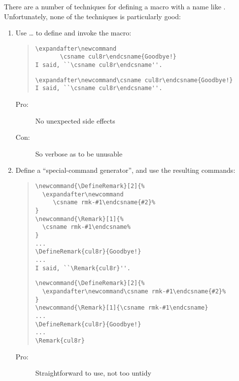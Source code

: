 There are a number of techniques for defining a macro with a name like
.  Unfortunately, none of the techniques is particularly
good:
\begin{enumerate}
\item Use \dots{} to define and invoke the
  macro:
\begin{quote}
\begin{narrowversion}
\begin{verbatim}
\expandafter\newcommand
       \csname cul8r\endcsname{Goodbye!}
I said, ``\csname cul8r\endcsname''.
\end{verbatim}
\end{narrowversion}
\begin{wideversion}
\begin{verbatim}
\expandafter\newcommand\csname cul8r\endcsname{Goodbye!}
I said, ``\csname cul8r\endcsname''.
\end{verbatim}
\end{wideversion}
\end{quote}
  \begin{description}
  \item[Pro:] No unexpected side effects
  \item[Con:] So verbose as to be unusable
  \end{description}
\item Define a ``special-command generator'', and  use the resulting
  commands:
\begin{quote}
\begin{narrowversion}
\begin{verbatim}
\newcommand{\DefineRemark}[2]{%
  \expandafter\newcommand
     \csname rmk-#1\endcsname{#2}%
}
\newcommand{\Remark}[1]{%
  \csname rmk-#1\endcsname%
}
...
\DefineRemark{cul8r}{Goodbye!}
...
I said, ``\Remark{cul8r}''.
\end{verbatim}
\end{narrowversion}
\begin{wideversion}
\begin{verbatim}
\newcommand{\DefineRemark}[2]{%
  \expandafter\newcommand\csname rmk-#1\endcsname{#2}%
}
\newcommand{\Remark}[1]{\csname rmk-#1\endcsname}
...
\DefineRemark{cul8r}{Goodbye!}
...
\Remark{cul8r}
\end{verbatim}
\end{wideversion}
\end{quote}
  \begin{description}
  \item[Pro:] Straightforward to use, not too untidy

\end{description}
\end{enumerate}
